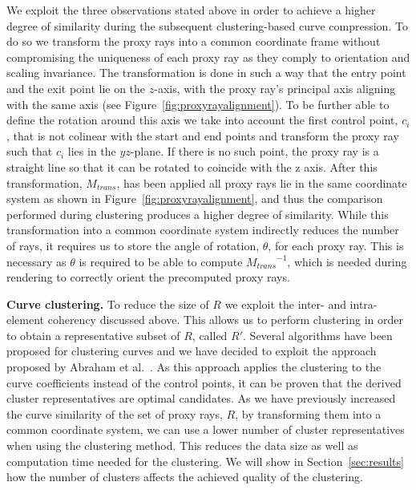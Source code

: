 \documentclass[journal]{vgtc}                %
\begin{document}
We exploit the three observations stated above in order to achieve a higher degree of similarity during the subsequent clustering-based curve compression. To do so we transform the proxy rays into a common coordinate frame without compromising the uniqueness of each proxy ray as they comply to orientation and scaling invariance. The transformation is done in such a way that the entry point and the exit point lie on the $z$-axis, with the proxy ray's principal axis aligning with the same axis (see Figure~\ref{fig:proxyrayalignment}). To be further able to define the rotation around this axis we take into account the first control point, $c_i$, that is not colinear with the start and end points and transform the proxy ray such that $c_i$ lies in the $yz$-plane. If there is no such point, the proxy ray is a straight line so that it can be rotated to coincide with the z axis. After this transformation, $M_{trans}$, has been applied all proxy rays lie in the same coordinate system as shown in Figure~\ref{fig:proxyrayalignment}, and thus the comparison performed during clustering produces a higher degree of similarity. While this transformation into a common coordinate system indirectly reduces the number of rays, it requires us to store the angle of rotation, $\theta$, for each proxy ray. This is necessary as $\theta$ is required to be able to compute ${M_{trans}}^{-1}$, which is needed during rendering to correctly orient the precomputed proxy rays.

\noindent \textbf{Curve clustering.} To reduce the size of $R$ we exploit the inter- and intra-element coherency discussed above. This allows us to perform clustering in order to obtain a representative subset of $R$, called $R'$. Several algorithms have been proposed for clustering curves and we have decided to exploit the approach proposed by Abraham et al.~\cite{abraham03clustering}. As this approach applies the clustering to the curve coefficients instead of the control points, it can be proven that the derived cluster representatives are optimal candidates. As we have previously increased the curve similarity of the set of proxy rays, $R$, by transforming them into a common coordinate system, we can use a lower number of cluster representatives when using the clustering method. This reduces the data size as well as computation time needed for the clustering. We will show in Section~\ref{sec:results} how the number of clusters affects the achieved quality of the clustering.
\end{document}
